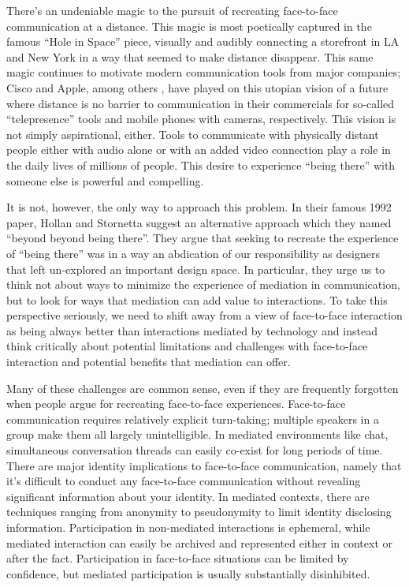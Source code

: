\documentclass{tufte-handout}
\begin{document}
There's an undeniable magic to the pursuit of recreating face-to-face communication at a distance. This magic is most poetically captured in the famous ``Hole in Space'' \cite{hole_in_space} piece, visually and audibly connecting a storefront in LA and New York in a way that seemed to make distance disappear. This same magic continues to motivate modern communication tools from major companies; Cisco and Apple, among others \cite{commercials}, have played on this utopian vision of a future where distance is no barrier to communication in their commercials for so-called ``telepresence'' tools and mobile phones with cameras, respectively. This vision is not simply aspirational, either. Tools to communicate with physically distant people either with audio alone or with an added video connection play a role in the daily lives of millions of people. This desire to experience ``being there'' with someone else is powerful and compelling. 

It is not, however, the only way to approach this problem. In their famous 1992 paper, Hollan and Stornetta \cite{beyond_being_there} suggest an alternative approach which they named ``beyond beyond being there''. They argue that seeking to recreate the experience of ``being there'' was in a way an abdication of our responsibility as designers that left un-explored an important design space. In particular, they urge us to think not about ways to minimize the experience of mediation in communication, but to look for ways that mediation can add value to interactions. To take this perspective seriously, we need to shift away from a view of face-to-face interaction as being always better than interactions mediated by technology and instead think critically about potential limitations and challenges with face-to-face interaction and potential benefits that mediation can offer. 


Many of these challenges are common sense, even if they are frequently forgotten when people argue for recreating face-to-face experiences. Face-to-face communication requires relatively explicit turn-taking; multiple speakers in a group make them all largely unintelligible. In mediated environments like chat, simultaneous conversation threads can easily co-exist for long periods of time. There are major identity implications to face-to-face communication, namely that it's difficult to conduct any face-to-face communication without revealing significant information about your identity. In mediated contexts, there are techniques ranging from anonymity to pseudonymity to limit identity disclosing information. Participation in non-mediated interactions is ephemeral, while mediated interaction can easily be archived and represented either in context or after the fact. Participation in face-to-face situations can be limited by confidence, but mediated participation is usually substantially disinhibited. \cite{???}
\end{document}
